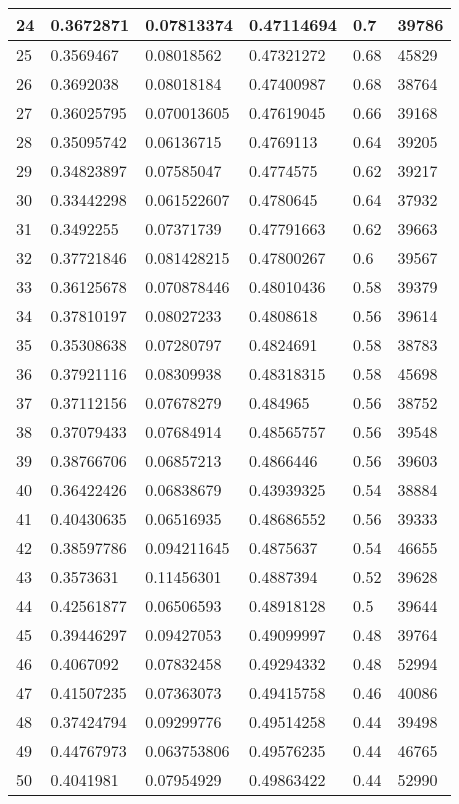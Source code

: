 \begin{longtable}{|l|l|l|l|l|l|}
24 & 0.3672871 & 0.07813374 & 0.47114694 & 0.7 & 39786 \\ \hline 
25 & 0.3569467 & 0.08018562 & 0.47321272 & 0.68 & 45829 \\ \hline 
26 & 0.3692038 & 0.08018184 & 0.47400987 & 0.68 & 38764 \\ \hline 
27 & 0.36025795 & 0.070013605 & 0.47619045 & 0.66 & 39168 \\ \hline 
28 & 0.35095742 & 0.06136715 & 0.4769113 & 0.64 & 39205 \\ \hline 
29 & 0.34823897 & 0.07585047 & 0.4774575 & 0.62 & 39217 \\ \hline 
30 & 0.33442298 & 0.061522607 & 0.4780645 & 0.64 & 37932 \\ \hline 
31 & 0.3492255 & 0.07371739 & 0.47791663 & 0.62 & 39663 \\ \hline 
32 & 0.37721846 & 0.081428215 & 0.47800267 & 0.6 & 39567 \\ \hline 
33 & 0.36125678 & 0.070878446 & 0.48010436 & 0.58 & 39379 \\ \hline 
34 & 0.37810197 & 0.08027233 & 0.4808618 & 0.56 & 39614 \\ \hline 
35 & 0.35308638 & 0.07280797 & 0.4824691 & 0.58 & 38783 \\ \hline 
36 & 0.37921116 & 0.08309938 & 0.48318315 & 0.58 & 45698 \\ \hline 
37 & 0.37112156 & 0.07678279 & 0.484965 & 0.56 & 38752 \\ \hline 
38 & 0.37079433 & 0.07684914 & 0.48565757 & 0.56 & 39548 \\ \hline 
39 & 0.38766706 & 0.06857213 & 0.4866446 & 0.56 & 39603 \\ \hline 
40 & 0.36422426 & 0.06838679 & 0.43939325 & 0.54 & 38884 \\ \hline 
41 & 0.40430635 & 0.06516935 & 0.48686552 & 0.56 & 39333 \\ \hline 
42 & 0.38597786 & 0.094211645 & 0.4875637 & 0.54 & 46655 \\ \hline 
43 & 0.3573631 & 0.11456301 & 0.4887394 & 0.52 & 39628 \\ \hline 
44 & 0.42561877 & 0.06506593 & 0.48918128 & 0.5 & 39644 \\ \hline 
45 & 0.39446297 & 0.09427053 & 0.49099997 & 0.48 & 39764 \\ \hline 
46 & 0.4067092 & 0.07832458 & 0.49294332 & 0.48 & 52994 \\ \hline 
47 & 0.41507235 & 0.07363073 & 0.49415758 & 0.46 & 40086 \\ \hline 
48 & 0.37424794 & 0.09299776 & 0.49514258 & 0.44 & 39498 \\ \hline 
49 & 0.44767973 & 0.063753806 & 0.49576235 & 0.44 & 46765 \\ \hline 
50 & 0.4041981 & 0.07954929 & 0.49863422 & 0.44 & 52990 \\ \hline 
\end{longtable}